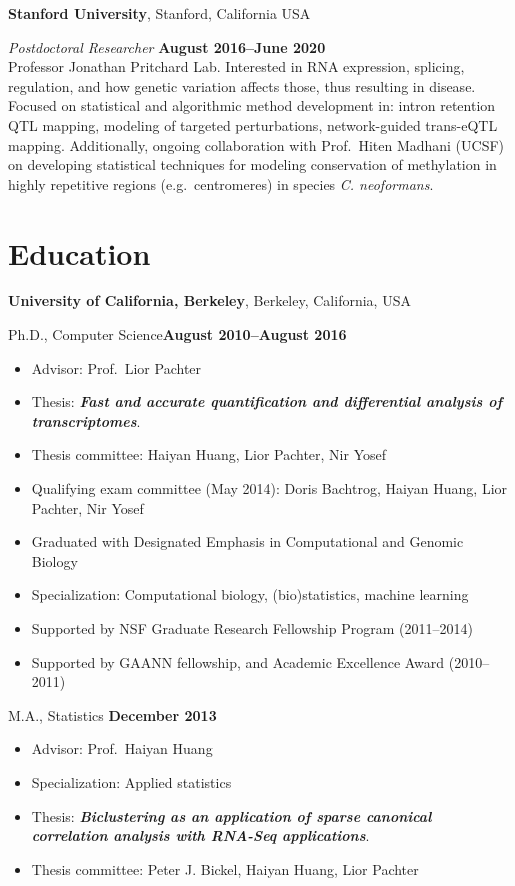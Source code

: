 \documentclass[11pt,notitlepage]{article} %
\begin{document}
\bigskip

{\bf Stanford University}, Stanford, California USA

{\em Postdoctoral Researcher} \hfill {\bf August 2016--June 2020}\\
Professor Jonathan Pritchard Lab.
Interested in RNA expression, splicing, regulation, and how genetic variation affects those, thus resulting in disease.
Focused on statistical and algorithmic method development in: intron retention QTL mapping, modeling of targeted perturbations, network-guided trans-eQTL mapping.
Additionally, ongoing collaboration with Prof.\ Hiten Madhani (UCSF) on developing statistical techniques for modeling conservation of methylation in highly repetitive regions (e.g.\ centromeres) in species \textit{C. neoformans}.


\bigskip
\section*{Education}
\medskip

{\bf University of California, Berkeley}, Berkeley, California, USA

Ph.D., Computer Science\hfill {\bf August 2010--August 2016}
\begin{itemize}[noitemsep,topsep=0pt]
\item Advisor: Prof.\ Lior Pachter
\item Thesis: \textit{\textbf{Fast and accurate quantification and differential analysis of transcriptomes}}.
\item Thesis committee: Haiyan Huang, Lior Pachter, Nir Yosef
\item Qualifying exam committee (May 2014): Doris Bachtrog, Haiyan Huang, Lior Pachter, Nir Yosef
\item Graduated with Designated Emphasis in Computational and Genomic Biology
\item Specialization: Computational biology, (bio)statistics, machine learning
\item Supported by NSF Graduate Research Fellowship Program (2011--2014)
\item Supported by GAANN fellowship, and Academic Excellence Award (2010--2011)
\end{itemize}

\newpage

M.A., Statistics \hfill {\bf December 2013}
\begin{itemize}[noitemsep,topsep=0pt]
\item Advisor: Prof.\ Haiyan Huang
\item Specialization: Applied statistics
\item Thesis: \textit{\textbf{Biclustering as an application of sparse canonical correlation analysis with RNA-Seq applications}}.
\item Thesis committee: Peter J. Bickel, Haiyan Huang, Lior Pachter
\end{itemize}
\end{document}
